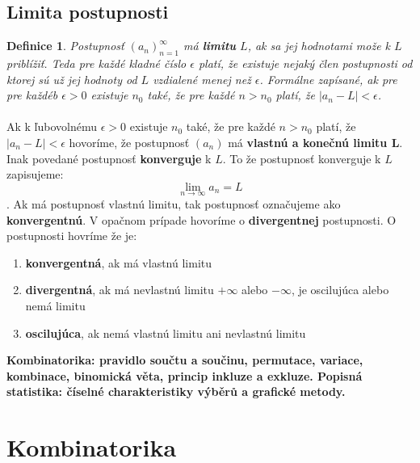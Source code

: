 \documentclass[12pt,a4paper]{article}
\newtheorem{definition}{Definice}
\begin{document}
\subsection{Limita postupnosti}
\begin{definition}
	Postupnosť $(a_{n})_{n=1}^{\infty}$ má \textbf{limitu} $L$, ak sa jej hodnotami može k $L$ priblížiť. Teda pre každé kladné číslo $\epsilon$ platí, že existuje nejaký člen postupnosti od ktorej sú už jej hodnoty od $L$ vzdialené menej než $\epsilon$. Formálne zapísané, ak pre pre každéb $\epsilon>0$ existuje $n_{0}$ také, že pre každé $n>n_{0}$ platí, že $|a_{n}-L|<\epsilon$.
\end{definition}

\paragraph{}
Ak k ľubovolnému $\epsilon>0$ existuje $n_{0}$ také, že pre každé $n>n_{0}$ platí, že $|a_{n}-L|<\epsilon$ hovoríme, že postupnosť $(a_{n})$ má \textbf{vlastnú a konečnú limitu L}. Inak povedané postupnosť \textbf{konverguje} k $L$. To že postupnosť konverguje k $L$ zapisujeme: $$\lim_{n\rightarrow \infty} a_{n}=L$$. Ak má postupnosť vlastnú limitu, tak postupnosť označujeme ako \textbf{konvergentnú}. V opačnom prípade hovoríme o \textbf{divergentnej} postupnosti. O postupnosti hovríme že je:

\begin{enumerate}
	\item \textbf{konvergentná}, ak má vlastnú limitu
	\item \textbf{divergentná}, ak má nevlastnú limitu $+\infty$ alebo $-\infty$, je oscilujúca alebo nemá limitu
	\item \textbf{oscilujúca}, ak nemá vlastnú limitu ani nevlastnú limitu
\end{enumerate}
\newpage
\textbf{Kombinatorika: pravidlo součtu a součinu, permutace, variace, kombinace, binomická věta, princip inkluze a
exkluze. Popisná statistika: číselné charakteristiky výběrů a grafické metody.}

\section{Kombinatorika}
\end{document}
